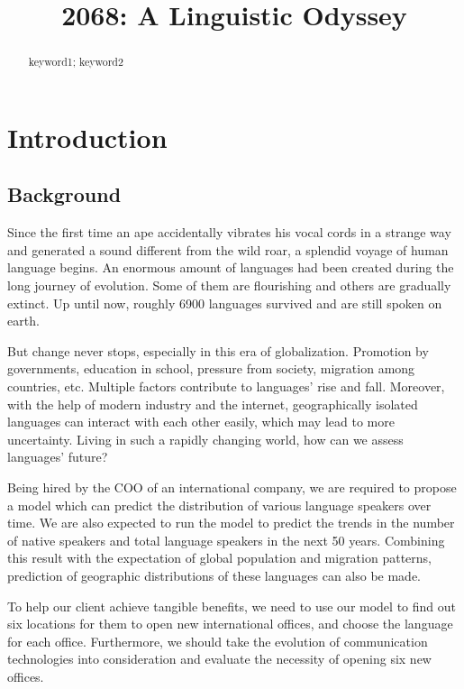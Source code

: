 \documentclass{mcmthesis}
\title{2068: A Linguistic Odyssey}
\begin{document}
\begin{abstract}
\begin{keywords}
keyword1; keyword2
\end{keywords}
\end{abstract}
\maketitle
\tableofcontents
\newpage
\section{Introduction}
\subsection{Background}
Since the first time an ape accidentally vibrates his vocal cords in a strange way and generated a sound different from the wild roar, a splendid voyage of human language begins. An enormous amount of languages had been created during the long journey of evolution. Some of them are flourishing and others are gradually extinct. Up until now, roughly 6900 languages survived and are still spoken on earth.

But change never stops, especially in this era of globalization. Promotion by governments, education in school, pressure from society, migration among countries, etc. Multiple factors contribute to languages' rise and fall. Moreover, with the help of modern industry and the internet, geographically isolated languages can interact with each other easily, which may lead to more uncertainty. Living in such a rapidly changing world, how can we assess languages' future?

Being hired by the COO of an international company, we are required to propose a model which can predict the distribution of various language speakers over time. We are also expected to run the model to predict the trends in the number of native speakers and total language speakers in the next 50 years. Combining this result with the expectation of global population and migration patterns, prediction of geographic distributions of these languages can also be made.

To help our client achieve tangible benefits, we need to use our model to find out six locations for them to open new international offices, and choose the language for each office. Furthermore, we should take the evolution of communication technologies into consideration and evaluate the necessity of opening six new offices.
\end{document}
